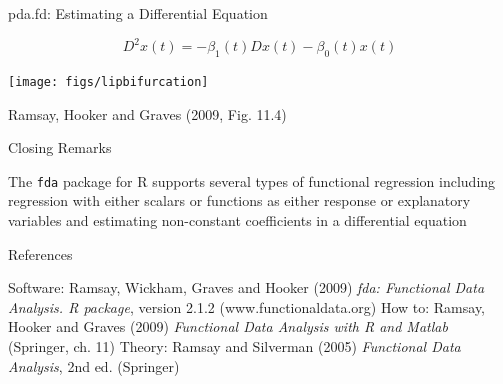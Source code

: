 \documentclass[compress]{beamer}
\begin{document}
\begin{frame}{pda.fd:  Estimating a Differential Equation}

\begin{equation} 
  D^2 x(t) = -\beta_1(t) Dx(t) - \beta_0 (t) x(t)
\end{equation}

\texttt{[image: figs/lipbifurcation]}

Ramsay, Hooker and Graves (2009, Fig. 11.4)

\end{frame}
\begin{frame}{Closing Remarks}

The \texttt{fda} package for R supports several types of functional regression 
\newline \newline
including regression with either scalars or functions 
\newline \newline
as either response or explanatory variables 
\newline \newline
and estimating non-constant coefficients in a differential equation

\end{frame}

\begin{frame}{References}

Software:   Ramsay, Wickham, Graves and Hooker (2009)
\emph{fda: Functional Data Analysis. R package}, version 2.1.2
(www.functionaldata.org)
\newline \newline
How to:  Ramsay, Hooker and Graves (2009)
\emph{Functional Data Analysis with R and Matlab}
(Springer, ch. 11)
\newline \newline
Theory:  Ramsay and Silverman (2005)
\emph{Functional Data Analysis}, 2nd ed.
(Springer)

\end{frame}
\end{document}
